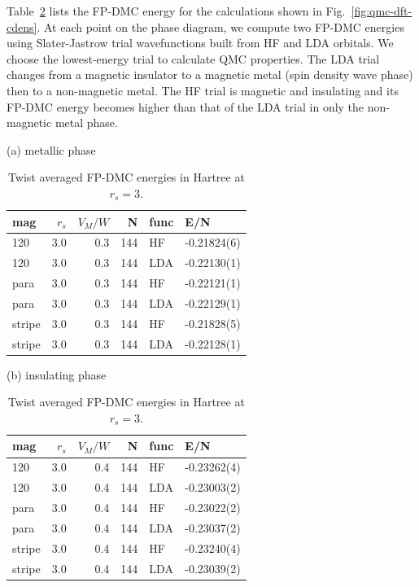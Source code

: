 Table~\ref{tab:dmc-energy} lists the FP-DMC energy for the calculations shown in Fig.~\ref{fig:qmc-dft-cdens}. At each point on the phase diagram, we compute two FP-DMC energies using Slater-Jastrow trial wavefunctions built from HF and LDA orbitals. We choose the lowest-energy trial to calculate QMC properties. The LDA trial changes from a magnetic insulator to a magnetic metal (spin density wave phase) then to a non-magnetic metal. The HF trial is magnetic and insulating and its FP-DMC energy becomes higher than that of the LDA trial in only the non-magnetic metal phase.

\begin{table}[h]
\caption{Twist averaged FP-DMC energies in Hartree at $r_s=3$.}
\label{tab:dmc-energy}
\begin{minipage}{0.48\textwidth}
(a) metallic phase \\ %
\begin{tabular}{lrrrll}
\toprule
   mag &  $r_s$ &  $V_M/W$ &   N & func &         E/N \\
\midrule
   120 &    3.0 &      0.3 & 144 &   HF & -0.21824(6) \\
   120 &    3.0 &      0.3 & 144 &  LDA & -0.22130(1) \\
  para &    3.0 &      0.3 & 144 &   HF & -0.22121(1) \\
  para &    3.0 &      0.3 & 144 &  LDA & -0.22129(1) \\
stripe &    3.0 &      0.3 & 144 &   HF & -0.21828(5) \\
stripe &    3.0 &      0.3 & 144 &  LDA & -0.22128(1) \\
\bottomrule
\end{tabular}
\end{minipage}
\begin{minipage}{0.48\textwidth}
(b) insulating phase \\
\begin{tabular}{lrrrll}
\toprule
   mag &  $r_s$ &  $V_M/W$ &   N & func &         E/N \\
\midrule
   120 &    3.0 &      0.4 & 144 &   HF & -0.23262(4) \\
   120 &    3.0 &      0.4 & 144 &  LDA & -0.23003(2) \\
  para &    3.0 &      0.4 & 144 &   HF & -0.23022(2) \\
  para &    3.0 &      0.4 & 144 &  LDA & -0.23037(2) \\
stripe &    3.0 &      0.4 & 144 &   HF & -0.23240(4) \\
stripe &    3.0 &      0.4 & 144 &  LDA & -0.23039(2) \\
\bottomrule
\end{tabular}
\end{minipage}
\end{table}

